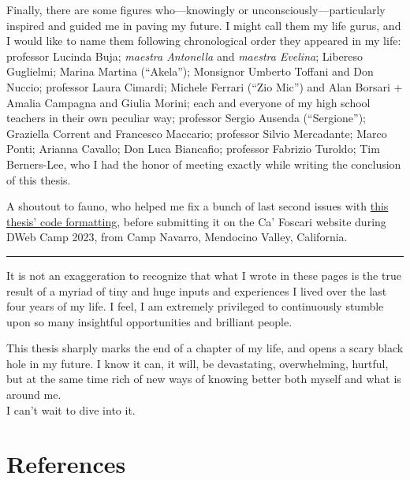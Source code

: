 \documentclass[
  a4paper,
]{book}
\begin{document}
Finally, there are some figures who---knowingly or unconsciously---particularly inspired and guided me in paving my future. I might call them my life gurus, and I would like to name them following chronological order they appeared in my life: professor Lucinda Buja; \emph{maestra Antonella} and \emph{maestra Evelina}; Libereso Guglielmi; Marina Martina (``Akela''); Monsignor Umberto Toffani and Don Nuccio; professor Laura Cimardi; Michele Ferrari (``Zio Mic'') and Alan Borsari + Amalia Campagna and Giulia Morini; each and everyone of my high school teachers in their own peculiar way; professor Sergio Ausenda (``Sergione''); Graziella Corrent and Francesco Maccario; professor Silvio Mercadante; Marco Ponti; Arianna Cavallo; Don Luca Biancafio; professor Fabrizio Turoldo; Tim Berners-Lee, who I had the honor of meeting exactly while writing the conclusion of this thesis.

A shoutout to fauno, who helped me fix a bunch of last second issues with \href{https://tommi.space/pandoc-workflow}{this thesis' code formatting}, before submitting it on the Ca' Foscari website during DWeb Camp 2023, from Camp Navarro, Mendocino Valley, California.

\begin{center}\rule{0.5\linewidth}{0.5pt}\end{center}

It is not an exaggeration to recognize that what I wrote in these pages is the true result of a myriad of tiny and huge inputs and experiences I lived over the last four years of my life. I feel, I am extremely privileged to continuously stumble upon so many insightful opportunities and brilliant people.

This thesis sharply marks the end of a chapter of my life, and opens a scary black hole in my future. I know it can, it will, be devastating, overwhelming, hurtful, but at the same time rich of new ways of knowing better both myself and what is around me.\\
I can't wait to dive into it.

\hypertarget{references}{%
\chapter*{References}\label{references}}
\end{document}

